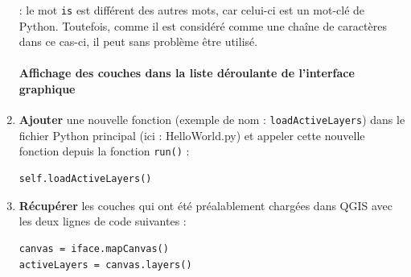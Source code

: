 \documentclass[11pt]{article}
\begin{document}
\begin{enumerate}
\underline{}: le mot \og \texttt{is} \fg{} est différent des autres mots, car celui-ci est un mot-clé de Python. Toutefois, comme il est considéré comme une chaîne de caractères dans ce cas-ci, il peut sans problème être utilisé. 

\paragraph*{Affichage des couches dans la liste déroulante de l'interface graphique}


\item \textbf{Ajouter} une nouvelle fonction (exemple de nom : \og{}\texttt{loadActiveLayers}\fg{}) dans le fichier Python principal (ici : \og{}HelloWorld.py\fg{}) et appeler cette nouvelle fonction depuis la fonction \og{}\texttt{run()}\fg{} :
\vspace*{-1em}
\begin{center}
\begin{minipage}[t]{0.28\textwidth}
\begin{verbatim}
self.loadActiveLayers()
\end{verbatim}
\end{minipage}
\end{center}
\vspace*{1em}




 
\item \textbf{Récupérer} les couches qui ont été préalablement chargées dans QGIS avec les deux lignes de code suivantes : 
\vspace*{-1.64em}
\begin{center}
\begin{minipage}[t]{0.36\textwidth}
\begin{verbatim}
canvas = iface.mapCanvas()
activeLayers = canvas.layers()
\end{verbatim}
\end{minipage}
\end{center}
\vspace*{1em}




\end{enumerate}
\end{document}
